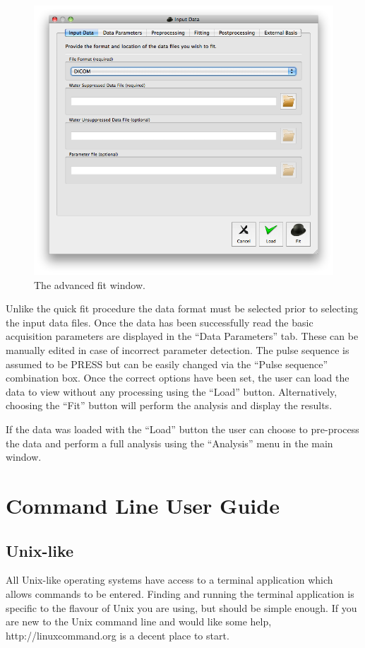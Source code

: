 \documentclass[a4paper,12pt]{article}
\begin{document}
\begin{figure}[h!]
\centering
\includegraphics[width=\textwidth]{figs/adv_fit.png}
\caption{The advanced fit window.}
\label{adv_fit}
\end{figure}

Unlike the quick fit procedure the data format must be selected prior to selecting the input data files.  Once the data has been successfully read the basic acquisition parameters are displayed in the ``Data Parameters'' tab.  These can be manually edited in case of incorrect parameter detection.  The pulse sequence is assumed to be PRESS but can be easily changed via the ``Pulse sequence'' combination box. Once the correct options have been set, the user can load the data to view without any processing using the ``Load'' button. Alternatively, choosing the ``Fit'' button will perform the analysis and display the results.

If the data was loaded with the ``Load'' button the user can choose to pre-process the data and perform a full analysis using the ``Analysis'' menu in the main window.

\section{Command Line User Guide}
\subsection{Unix-like}
All Unix-like operating systems have access to a terminal application which allows commands to be entered. Finding and running the terminal application is specific to the flavour of Unix you are using, but should be simple enough.  If you are new to the Unix command line and would like some help, http://linuxcommand.org is a decent place to start.
\end{document}
